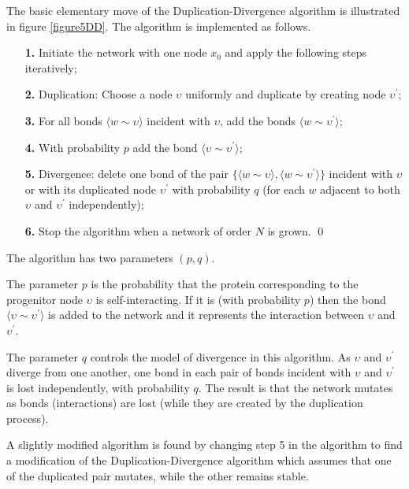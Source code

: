 \documentclass[12pt]{iopart}
\def\edge#1#2{{\langle #1{\sim}#2 \rangle}}
\begin{document}
The basic elementary move of the Duplication-Divergence algorithm is illustrated
in figure \ref{figure5DD}.  The algorithm is implemented as follows.

\vspace{1mm}
\begin{enumerate}
\item[\bf 1.] Initiate the network with one node $x_0$ and apply the following steps iteratively;
\item[\bf 2.] Duplication: Choose a node $\upsilon$ uniformly and duplicate by creating
node $\upsilon^\prime$;
\item[\bf 3.]  For all bonds $\edge{w}{\upsilon}$ incident with
$\upsilon$, add the bonds $\edge{w}{\upsilon^\prime}$;
\item[\bf 4.] With probability $p$ add the bond $\edge{\upsilon}{\upsilon^\prime}$;
\item[\bf 5.] Divergence: delete one bond of the pair $\{ \edge{w}{\upsilon}, \edge{w}{\upsilon^\prime}\}$
 incident with $\upsilon$ or with its duplicated node $\upsilon^\prime$ with probability $q$
(for each $w$ adjacent to both $\upsilon$ and $\upsilon^\prime$ independently);
\item[\bf 6.] Stop the algorithm when a network of order $N$ is grown.
\qed
\end{enumerate}
\vspace{5mm}

The algorithm has two parameters $(p,q)$.  

The parameter $p$ is the probability that the protein corresponding to the
progenitor node $\upsilon$ is self-interacting.  If it is (with probability $p$)
then the bond $\edge{\upsilon}{\upsilon^\prime}$ is added to the network
and it represents the interaction between $\upsilon$ and $\upsilon^\prime$.

The parameter $q$ controls the model of divergence in this algorithm.  As
$\upsilon$ and $\upsilon^\prime$ diverge from one another,  one bond in 
each pair of bonds incident with $\upsilon$ and $\upsilon^\prime$  is lost
independently, with probability $q$.  The result is that the network mutates
as bonds (interactions) are lost (while they are created by the duplication
process).

A slightly modified algorithm is found by changing step 5 in the algorithm to
find a modification of the Duplication-Divergence algorithm which assumes that
one of the duplicated pair mutates, while the other remains stable.
\end{document}
